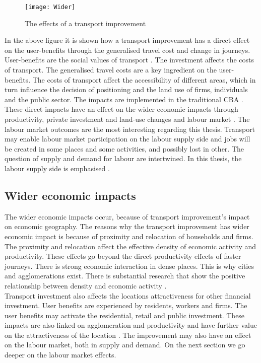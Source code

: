 \begin{figure}[H]
\centering
\texttt{[image: Wider]}
\caption{The effects of a transport improvement \citep{venables2017}}
\label{fig:Wider}
\end{figure} 

In the above figure it is shown how a transport improvement has a direct effect on the user-benefits through the generalised travel cost and change in journeys. User-benefits are the social values of transport \citep{venables2017}. The investment affects the costs of transport. The generalised travel costs are a key ingredient on the user-benefits. The costs of transport affect the accessibility of different areas, which in turn influence the decision of positioning and the land use of firms, individuals and the public sector. The impacts are implemented in the traditional CBA \citep{laakso}. These direct impacts have an effect on the wider economic impacts through productivity, private investment and land-use changes and labour market \citep{venables2017}. The labour market outcomes are the most interesting regarding this thesis. Transport may enable labour market participation on the labour supply side and jobs will be created in some places and some activities, and possibly lost in other. The question of supply and demand for labour are intertwined. In this thesis, the labour supply side is emphasised \citep{venables2017}. \\


\subsection{Wider economic impacts}

The wider economic impacts occur, because of transport improvement's impact on economic geography. The reasons why the transport improvement has wider economic impact is because of proximity and relocation of households and firms. The proximity and relocation affect the effective density of economic activity and productivity. These effects go beyond the direct productivity effects of faster journeys. There is strong economic interaction in dense places. This is why cities and agglomerations exist. There is substantial research that show the positive relationship between density and economic activity \citep{venables2017}.  \\

Transport investment also affects the locations attractiveness for other financial investment. User benefits are experienced by residents, workers and firms. The user benefits may activate the residential, retail and public investment. These impacts are also linked on agglomeration and productivity and have further value on the attractiveness of the location \citep{venables2017}. The improvement may also have an effect on the labour market, both in supply and demand. On the next section we go deeper on the labour market effects. \\

